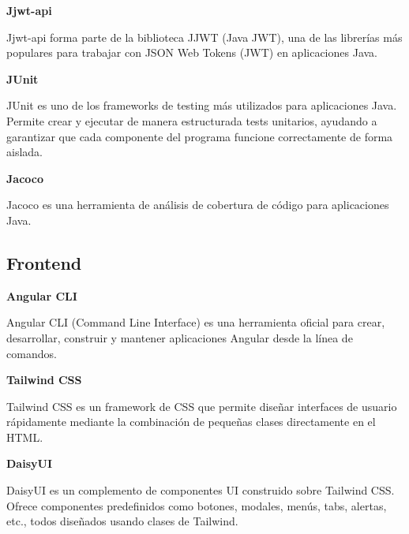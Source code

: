 \textbf{Jjwt-api}

Jjwt-api forma parte de la biblioteca JJWT (Java JWT)\cite{jjwt:official}, una de las librerías más populares para trabajar con
JSON Web Tokens (JWT) en aplicaciones Java.


\textbf{JUnit}

JUnit\cite{junit:official} es uno de los frameworks de testing más utilizados para aplicaciones Java.
Permite crear y ejecutar de manera estructurada tests unitarios, ayudando a garantizar que cada componente del
programa funcione correctamente de forma aislada.

\textbf{Jacoco}

Jacoco\cite{jacoco:official} es una herramienta de análisis de cobertura de código para aplicaciones Java.

\subsection{Frontend}\label{subsec:librerias_frontend}



\textbf{Angular CLI}

Angular CLI (Command Line Interface)\cite{angularcli:official} es una herramienta oficial para crear, desarrollar,
construir y mantener aplicaciones Angular desde la línea de comandos.


\textbf{Tailwind CSS}

Tailwind CSS\cite{tailwind:official} es un framework de CSS que permite diseñar interfaces de usuario
rápidamente mediante la combinación de pequeñas clases directamente en el HTML.


\textbf{DaisyUI}

DaisyUI\cite{daisyui:official} es un complemento de componentes UI construido sobre Tailwind CSS. Ofrece componentes
predefinidos como botones, modales, menús, tabs, alertas, etc., todos diseñados usando clases de Tailwind.



